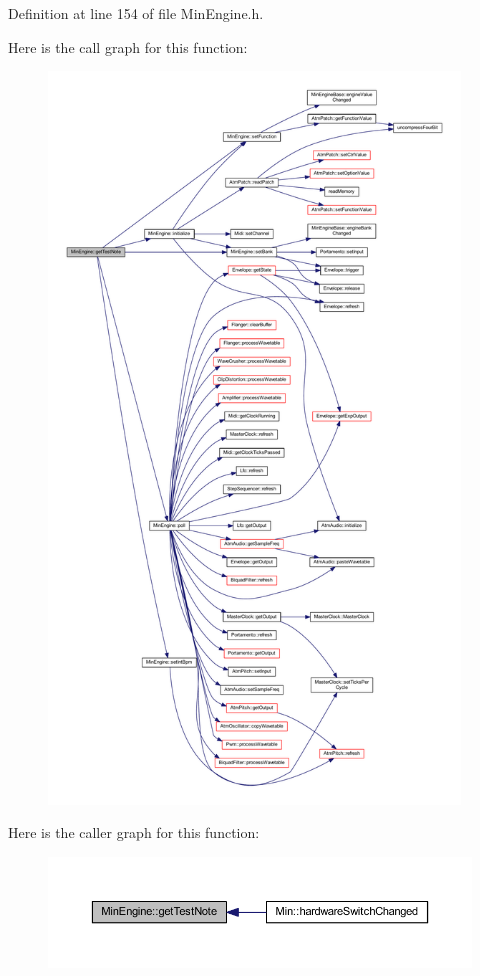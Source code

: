 Definition at line 154 of file Min\+Engine.\+h.

Here is the call graph for this function\+:
\nopagebreak
\begin{figure}[H]
\begin{center}
\leavevmode
\includegraphics[height=550pt]{class_min_engine_a461861aff0eb8271558c9c20bc040b56_cgraph}
\end{center}
\end{figure}
Here is the caller graph for this function\+:
\nopagebreak
\begin{figure}[H]
\begin{center}
\leavevmode
\includegraphics[width=350pt]{class_min_engine_a461861aff0eb8271558c9c20bc040b56_icgraph}
\end{center}
\end{figure}
\mbox{\label{class_min_engine_ae59276976966cfd710288c1bbf1ea0cf}} 
